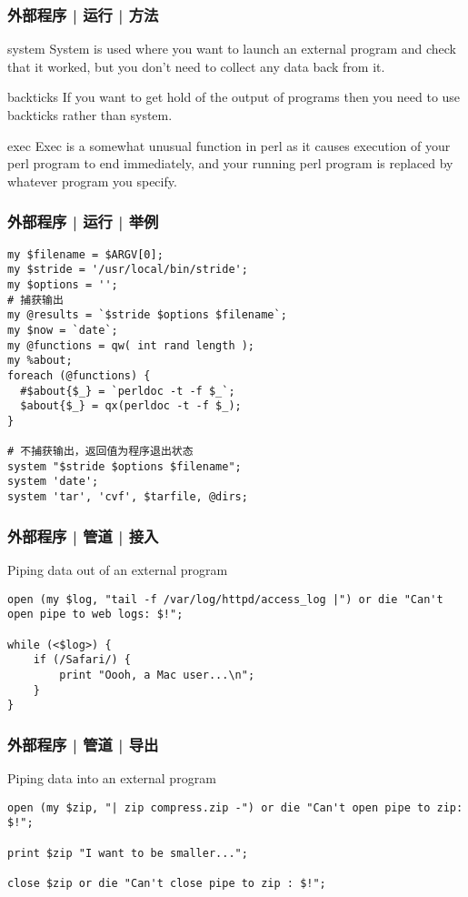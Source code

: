 \begin{frame}[fragile]
  \frametitle{外部程序 | 运行 | 方法}
  \begin{block}{system}
    System is used where you want to launch an external program and check that it worked, but
you don't need to collect any data back from it.
  \end{block}
  \pause
  \begin{block}{backticks}
    If you want to get hold of the output of programs then you need to use backticks rather than system.
  \end{block}
  \pause
  \begin{block}{exec}
    Exec is a somewhat unusual function in perl as it causes execution of your perl program to end immediately, and your running perl program is replaced by whatever program you specify.
  \end{block}
\end{frame}

\begin{frame}[fragile]
  \frametitle{外部程序 | 运行 | 举例}
\begin{lstlisting}[basicstyle=\small\tt]
my $filename = $ARGV[0];
my $stride = '/usr/local/bin/stride';
my $options = '';
# 捕获输出
my @results = `$stride $options $filename`;
my $now = `date`;
my @functions = qw( int rand length );
my %about;
foreach (@functions) {
  #$about{$_} = `perldoc -t -f $_`;
  $about{$_} = qx(perldoc -t -f $_);
}

# 不捕获输出，返回值为程序退出状态
system "$stride $options $filename";
system 'date';
system 'tar', 'cvf', $tarfile, @dirs;
\end{lstlisting}
\end{frame}

\begin{frame}[fragile]
  \frametitle{外部程序 | 管道 | 接入}
  \begin{block}{Piping data out of an external program}
\begin{lstlisting}
open (my $log, "tail -f /var/log/httpd/access_log |") or die "Can't open pipe to web logs: $!";

while (<$log>) {
    if (/Safari/) {
        print "Oooh, a Mac user...\n";
    }
}
\end{lstlisting}
  \end{block}
\end{frame}

\begin{frame}[fragile]
  \frametitle{外部程序 | 管道 | 导出}
  \begin{block}{Piping data into an external program}
\begin{lstlisting}
open (my $zip, "| zip compress.zip -") or die "Can't open pipe to zip: $!";

print $zip "I want to be smaller...";

close $zip or die "Can't close pipe to zip : $!";
\end{lstlisting}
  \end{block}
\end{frame}

